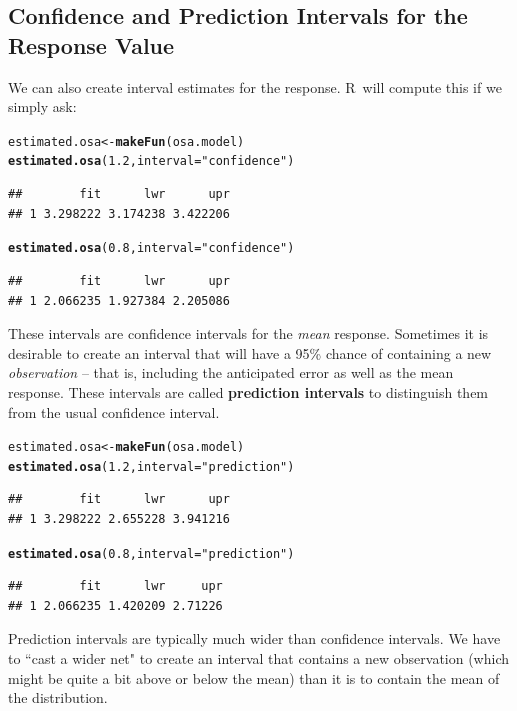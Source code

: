 \documentclass[twoside]{book}\usepackage[]{graphicx}\usepackage[]{xcolor}
\makeatletter
\newcommand{\hlnum}[1]{\textcolor[rgb]{0.686,0.059,0.569}{#1}}%
\newcommand{\hlstr}[1]{\textcolor[rgb]{0.192,0.494,0.8}{#1}}%
\newcommand{\hlstd}[1]{\textcolor[rgb]{0.345,0.345,0.345}{#1}}%
\newcommand{\hlkwb}[1]{\textcolor[rgb]{0.69,0.353,0.396}{#1}}%
\newcommand{\hlkwc}[1]{\textcolor[rgb]{0.333,0.667,0.333}{#1}}%
\newcommand{\hlkwd}[1]{\textcolor[rgb]{0.737,0.353,0.396}{\textbf{#1}}}%
\newenvironment{kframe}{%
 \def\at@end@of@kframe{}%
 \ifinner\ifhmode%
  \def\at@end@of@kframe{\end{minipage}}%
  \begin{minipage}{\columnwidth}%
 \fi\fi%
 \def\FrameCommand##1{\hskip\@totalleftmargin \hskip-\fboxsep
 \colorbox{shadecolor}{##1}\hskip-\fboxsep
     \hskip-\linewidth \hskip-\@totalleftmargin \hskip\columnwidth}%
 \MakeFramed {\advance\hsize-\width
   \@totalleftmargin\z@ \linewidth\hsize
   \@setminipage}}%
 {\par\unskip\endMakeFramed%
 \at@end@of@kframe}
\newenvironment{knitrout}{}{} %
\def\R{{\sf R}}
\def\term#1{\textbf{#1}}
\makeatother
\begin{document}
\subsection{Confidence and Prediction Intervals for the Response Value}
We can also create interval estimates for the response.    \R\ will compute
this if we simply ask:
\begin{knitrout}
\color{fgcolor}\begin{kframe}
\begin{alltt}
\hlstd{estimated.osa} \hlkwb{<-} \hlkwd{makeFun}\hlstd{(osa.model)}
\hlkwd{estimated.osa}\hlstd{(}\hlnum{1.2}\hlstd{,} \hlkwc{interval} \hlstd{=} \hlstr{"confidence"}\hlstd{)}
\end{alltt}
\begin{verbatim}
##        fit      lwr      upr
## 1 3.298222 3.174238 3.422206
\end{verbatim}
\begin{alltt}
\hlkwd{estimated.osa}\hlstd{(}\hlnum{0.8}\hlstd{,} \hlkwc{interval} \hlstd{=} \hlstr{"confidence"}\hlstd{)}
\end{alltt}
\begin{verbatim}
##        fit      lwr      upr
## 1 2.066235 1.927384 2.205086
\end{verbatim}
\end{kframe}
\end{knitrout}
These intervals are confidence intervals for the \emph{mean} response.  Sometimes it
is desirable to create an interval that will have a 95\% chance of containing a new 
\emph{observation} -- that is, including the anticipated error as well as the mean response.  These intervals are called \term{prediction intervals} to distinguish
them from the usual confidence interval.
\begin{knitrout}
\color{fgcolor}\begin{kframe}
\begin{alltt}
\hlstd{estimated.osa} \hlkwb{<-} \hlkwd{makeFun}\hlstd{(osa.model)}
\hlkwd{estimated.osa}\hlstd{(}\hlnum{1.2}\hlstd{,} \hlkwc{interval} \hlstd{=} \hlstr{"prediction"}\hlstd{)}
\end{alltt}
\begin{verbatim}
##        fit      lwr      upr
## 1 3.298222 2.655228 3.941216
\end{verbatim}
\begin{alltt}
\hlkwd{estimated.osa}\hlstd{(}\hlnum{0.8}\hlstd{,} \hlkwc{interval} \hlstd{=} \hlstr{"prediction"}\hlstd{)}
\end{alltt}
\begin{verbatim}
##        fit      lwr     upr
## 1 2.066235 1.420209 2.71226
\end{verbatim}
\end{kframe}
\end{knitrout}
Prediction intervals are typically much wider than confidence intervals.  We have to ``cast a wider net" 
to create an interval that contains a new observation (which might be quite a bit above 
or below the mean) than it is to contain the mean of the distribution.
\end{document}
